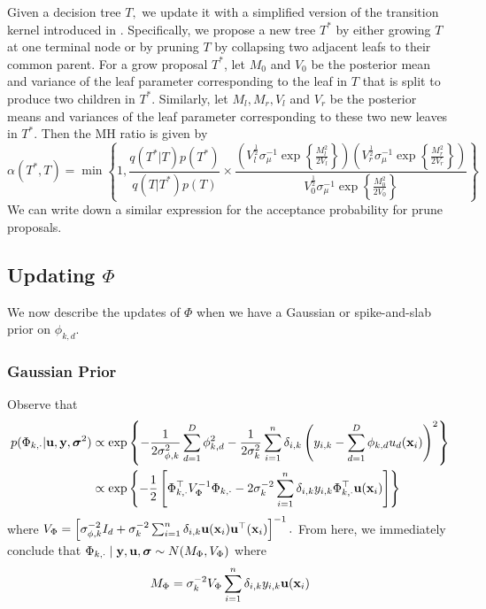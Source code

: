 \documentclass[12pt]{article}
\begin{document}
Given a decision tree $T,$ we update it with a simplified version of the transition kernel introduced in \citet{Chipman1998}.
Specifically, we propose a new tree $T^{*}$ by either growing $T$ at one terminal node or by pruning $T$ by collapsing two adjacent leafs to their common parent. 
For a grow proposal $T^{*}$, let $M_{0}$ and $V_{0}$ be the posterior mean and variance of the leaf parameter corresponding to the leaf in $T$ that is split to produce two children in $T^{*}.$
Similarly, let $M_{l}, M_{r}, V_{l}$ and $V_{r}$ be the posterior means and variances of the leaf parameter corresponding to these two new leaves in $T^{*}.$
Then the MH ratio is given by
$$
\alpha(T^{*},T) = \min\left\{1, \frac{q(T^{*} | T)p(T^{*})}{q(T | T^{*})p(T)} \times \frac{\left(V_{l}^{\frac{1}{2}}\sigma_{\mu}^{-1}\exp\left\{\frac{M_{l}^{2}}{2V_{l}}\right\}\right)\left(V_{r}^{\frac{1}{2}}\sigma_{\mu}^{-1}\exp\left\{\frac{M_{r}^{2}}{2V_{r}}\right\}\right)}{V_{0}^{\frac{1}{2}}\sigma_{\mu}^{-1}\exp\left\{\frac{M^{2}_{0}}{2V_{0}}\right\}}\right\}
$$
We can write down a similar expression for the acceptance probability for prune proposals. 

\subsection{Updating $\Phi$}

We now describe the updates of $\Phi$ when we have a Gaussian or spike-and-slab prior on $\phi_{k,d}.$
\subsubsection{Gaussian Prior}

Observe that
\begin{align*}
p(\Phi_{k,\cdot} | \bu, \by, \bsigma^{2}) &\propto \exp\left\{-\frac{1}{2\sigma^{2}_{\phi,k}}\sum_{d = 1}^{D}{\phi_{k,d}^{2}} - \frac{1}{2\sigma^{2}_{k}}\sum_{i = 1}^{n}{\delta_{i,k}\left(y_{i,k} - \sum_{d = 1}^{D}{\phi_{k,d}u_{d}(\bx_{i})}\right)^{2}}\right\}  \\
&\propto \exp\left\{-\frac{1}{2}\left[\Phi_{k,\cdot}^{\top}V_{\Phi}^{-1}\Phi_{k,\cdot} - 2\sigma^{-2}_{k}\sum_{i = 1}^{n}{\delta_{i,k}y_{i,k}\Phi_{k,\cdot}^{\top}\bu(\bx_{i})} \right]\right\}%
\end{align*}
where $V_{\Phi} = \left[\sigma^{-2}_{\phi,k}I_{d} + \sigma^{-2}_{k}\sum_{i = 1}^{n}{\delta_{i,k}\mathbf{u}(\mathbf{x}_{i})\mathbf{u}^{\top}(\mathbf{x}_{i})}\right]^{-1}.$
From here, we immediately conclude that $\Phi_{k,\cdot} \mid \mathbf{y}, \mathbf{u}, \boldsymbol{\sigma} \sim N(M_{\Phi}, V_{\Phi})$ where
$$
M_{\Phi} = \sigma^{-2}_{k}V_{\Phi}\sum_{i = 1}^{n}{\delta_{i,k}y_{i,k}\mathbf{u}(\mathbf{x}_{i})}
$$
\end{document}

